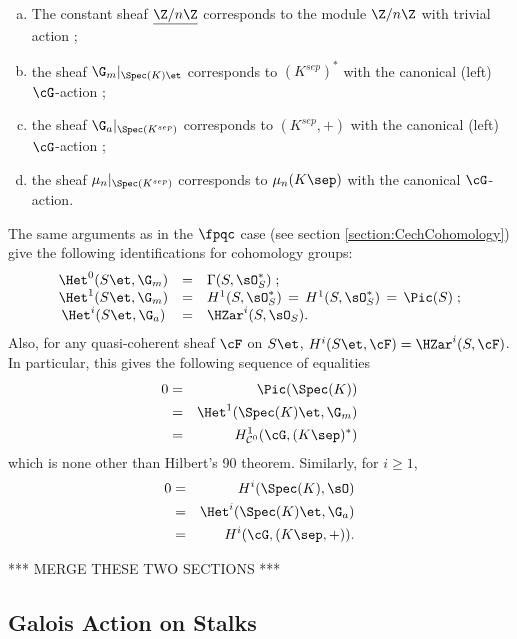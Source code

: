 \begin{example} $ $
\begin{enumerate}[(a)]
\item The constant sheaf $\underline{\Z/n\Z}$ corresponds to the module $\Z/n\Z$ with trivial action ; 
\item the sheaf $\G_m|_{\Spec(K)\et}$ corresponds to $(K^{sep})^*$ with the canonical (left) $\cG$-action ;
\item the sheaf $\G_a|_{\Spec(K^{sep})}$ corresponds to $(K^{sep}, +)$ with the canonical (left) $\cG$-action ;
\item the sheaf $\mu_n|_{\Spec(K^{sep})}$ corresponds to $\mu_n(K\sep)$ with the canonical $\cG$-action.
\end{enumerate}

The same arguments as in the $\fpqc$ case (see section \ref{section:CechCohomology}) give the following identifications for cohomology groups:
$$
\begin{array}{ccl}
\Het^0(S\et, \G_m) & = & \Gamma(S, \sO_S^*) \; ; \\
\Het^1(S\et, \G_m) & = & H^1(S, \sO_S^*) \, = \,  H^1(S, \sO_S^*) \, = \, \Pic(S) \; ;\\
\Het^i(S\et, \G_a) & = & \HZar^i(S, \sO_S).
\end{array}
$$
Also, for any quasi-coherent sheaf $\cF$ on $S\et$, $H^i(S\et, \cF) = \HZar^i(S, \cF)$.
In particular, this gives the following sequence of equalities
\begin{eqnarray*}
0 & = & \Pic(\Spec(K)) \\
& = & \Het^1(\Spec(K)\et, \G_m) \\
& = & H^1_{\mathcal{C}^0}(\cG, (K\sep)^*) 
\end{eqnarray*}
which is none other than Hilbert's 90 theorem. Similarly, for $i \geqslant 1$,
\begin{eqnarray*}
0 & = & H^i(\Spec(K), \sO) \\
&  = & \Het^i(\Spec(K)\et, \G_a) \\
& = & H^i(\cG, (K\sep, +)).
\end{eqnarray*}
\end{example}


*** MERGE THESE TWO SECTIONS ***

\subsection{Galois Action on Stalks}
\label{section:GaloisActionOnStalks}

